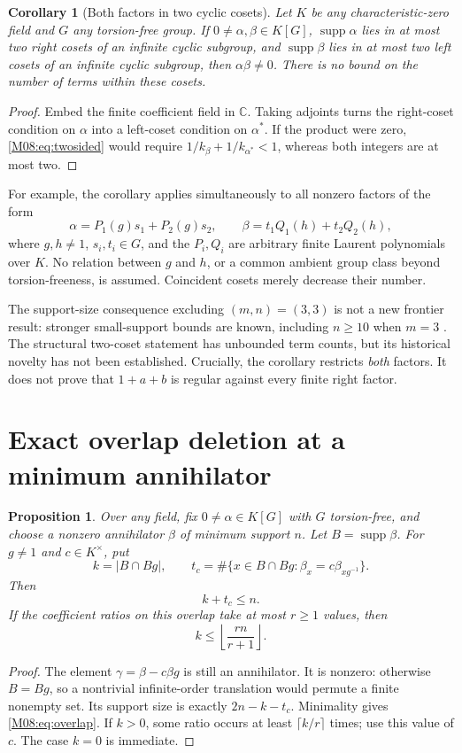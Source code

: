 \documentclass[11pt,a4paper,oneside]{report}
\newtheorem{proposition}[theorem]{Proposition}
\newtheorem{corollary}[theorem]{Corollary}
\theoremstyle{definition}
\theoremstyle{remark}
\DeclareMathOperator{\supp}{supp}
\newcommand{\C}{\mathbb C}
\begin{document}
\begin{corollary}[Both factors in two cyclic cosets]\label{M08:cor:two}
Let $K$ be any characteristic-zero field and $G$ any torsion-free
group. If $0\ne\alpha,\beta\in K[G]$, $\supp\alpha$ lies in at
most two right cosets of an infinite cyclic subgroup, and
$\supp\beta$ lies in at most two left cosets of an infinite cyclic
subgroup, then $\alpha\beta\ne0$. There is no bound on the
number of terms within these cosets.
\end{corollary}
\begin{proof}
Embed the finite coefficient field in $\C$. Taking adjoints turns
the right-coset condition on $\alpha$ into a left-coset condition
on $\alpha^*$. If the product were zero, \eqref{M08:eq:twosided}
would require $1/k_\beta+1/k_{\alpha^*}<1$, whereas both
integers are at most two.
\end{proof}

For example, the corollary applies simultaneously to all nonzero
factors of the form
\[
\alpha=P_1(g)s_1+P_2(g)s_2,
\qquad
\beta=t_1Q_1(h)+t_2Q_2(h),
\]
where $g,h\ne1$, $s_i,t_i\in G$, and the $P_i,Q_i$ are arbitrary
finite Laurent polynomials over $K$. No relation between $g$
and $h$, or a common ambient group class beyond torsion-freeness,
is assumed. Coincident cosets merely decrease their number.

The support-size consequence excluding $(m,n)=(3,3)$ is not a new
frontier result: stronger small-support bounds are known, including
$n\ge10$ when $m=3$ \cite{B:ATsmall}. The structural two-coset statement
has unbounded term counts, but its historical novelty has not been
established. Crucially, the corollary restricts \emph{both} factors.
It does not prove that $1+a+b$ is regular against every finite
right factor.

\section{Exact overlap deletion at a minimum annihilator}

\begin{proposition}\label{M08:prop:overlap}
Over any field, fix $0\ne\alpha\in K[G]$ with $G$ torsion-free,
and choose a nonzero annihilator $\beta$ of minimum support $n$.
Let $B=\supp\beta$. For $g\ne1$ and $c\in K^\times$, put
\[
k=|B\cap Bg|,\qquad
t_c=\#\{x\in B\cap Bg:\beta_x=c\beta_{xg^{-1}}\}.
\]
Then
\begin{equation}\label{M08:eq:overlap}
\boxed{k+t_c\le n.}
\end{equation}
If the coefficient ratios on this overlap take at most $r\ge1$
values, then
\[
k\le\left\lfloor\frac{rn}{r+1}\right\rfloor.
\]
\end{proposition}
\begin{proof}
The element $\gamma=\beta-c\beta g$ is still an annihilator.
It is nonzero: otherwise $B=Bg$, so a nontrivial infinite-order
translation would permute a finite nonempty set. Its support size
is exactly $2n-k-t_c$. Minimality gives \eqref{M08:eq:overlap}.
If $k>0$, some ratio occurs at least $\lceil k/r\rceil$ times;
use this value of $c$. The case $k=0$ is immediate.
\end{proof}
\end{document}
